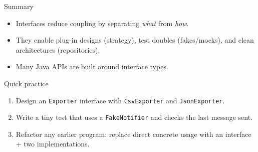 \documentclass{beamer}
\begin{document}
\begin{frame}{Summary}
  \begin{itemize}[<+->]
    \item Interfaces reduce coupling by separating \textit{what} from \textit{how}.
    \item They enable plug-in designs (strategy), test doubles (fakes/mocks), and clean architectures (repositories).
    \item Many Java APIs are built around interface types.
  \end{itemize}
\end{frame}

\begin{frame}{Quick practice}
  \begin{enumerate}[<+->]
    \item Design an \texttt{Exporter} interface with \texttt{CsvExporter} and \texttt{JsonExporter}.
    \item Write a tiny test that uses a \texttt{FakeNotifier} and checks the last message sent.
    \item Refactor any earlier program: replace direct concrete usage with an interface + two implementations.
  \end{enumerate}
\end{frame}
\end{document}

